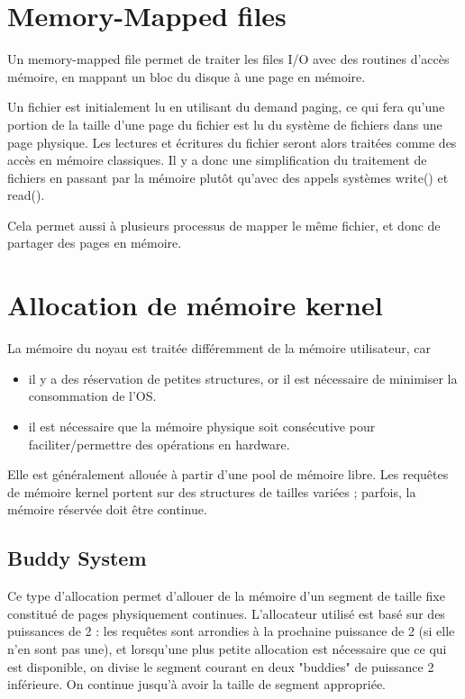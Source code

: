 	
\section{Memory-Mapped files}

Un memory-mapped file permet de traiter les files I/O avec des routines d'accès mémoire, en mappant un bloc du disque à une page en mémoire.

Un fichier est initialement lu en utilisant du demand paging, ce qui fera qu'une portion de la taille d'une page du fichier est lu du système de fichiers dans une page physique. Les lectures et écritures du fichier seront alors traitées comme des accès en mémoire classiques. Il y a donc une simplification du traitement de fichiers en passant par la mémoire plutôt qu'avec des appels systèmes write() et read().

Cela permet aussi à plusieurs processus de mapper le même fichier, et donc de partager des pages en mémoire.


\section{Allocation de mémoire kernel}

La mémoire du noyau est traitée différemment de la mémoire utilisateur, car

\begin{itemize}
	\item il y a des réservation de petites structures, or il est nécessaire de minimiser la consommation de l'OS.
	\item il est nécessaire que la mémoire physique soit consécutive pour faciliter/permettre des opérations en hardware.
\end{itemize}

Elle est généralement allouée à partir d'une pool de mémoire libre. Les requêtes de mémoire kernel portent sur des structures de tailles variées ; parfois, la mémoire réservée doit être continue.

\subsection{Buddy System}

Ce type d'allocation permet d'allouer de la mémoire d'un segment de taille fixe constitué de pages physiquement continues. L'allocateur utilisé est basé sur des puissances de 2 : les requêtes sont arrondies à la prochaine puissance de 2 (si elle n'en sont pas une), et lorsqu'une plus petite allocation est nécessaire que ce qui est disponible, on divise le segment courant en deux "buddies" de puissance 2 inférieure. On continue jusqu'à avoir la taille de segment appropriée.


